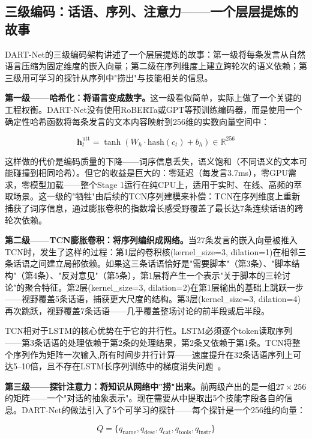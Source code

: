 \documentclass[twocolumn,10.5pt]{ctexart}
\begin{document}
\subsection{三级编码：话语、序列、注意力——一个层层提炼的故事}

DART-Net的三级编码架构讲述了一个层层提炼的故事：第一级将每条发言从自然语言压缩为固定维度的嵌入向量；第二级在序列维度上建立跨轮次的语义依赖；第三级用可学习的探针从序列中"捞出"与技能相关的信息。

\textbf{第一级——哈希化：将语言变成数字。}这一级看似简单，实际上做了一个关键的工程权衡。DART-Net没有使用RoBERTa或GPT等预训练编码器，而是使用一个确定性哈希函数将每条发言的文本内容映射到256维的实数向量空间中：

\begin{equation}
\mathbf{h}_t^{\text{utt}} = \tanh(W_h \cdot \text{hash}(c_t) + b_h) \in \mathbb{R}^{256}
\label{eq:hash_enc}
\end{equation}

这样做的代价是编码质量的下降——词序信息丢失，语义饱和（不同语义的文本可能碰撞到相同哈希）。但它的收益是巨大的：零延迟（每发言3.7ms），零GPU需求，零模型加载——整个Stage 1运行在纯CPU上，适用于实时、在线、高频的萃取场景。这一级的"牺牲"由后续的TCN序列建模来补偿：TCN在序列维度上重新捕获了词序信息，通过膨胀卷积的指数增长感受野覆盖了最长达7条连续话语的跨轮次依赖。

\textbf{第二级——TCN膨胀卷积：将序列编织成网络。}当27条发言的嵌入向量被推入TCN时，发生了这样的过程：第1层的卷积核(kernel\_size=3, dilation=1)在相邻三条话语之间建立局部依赖。如果这三条话语恰好是"需要脚本"（第3条）、"脚本结构"（第4条）、"反对意见"（第5条），第1层将产生一个表示"关于脚本的三轮讨论"的聚合特征。第2层(kernel\_size=3, dilation=2)在第1层输出的基础上跳跃一步——视野覆盖5条话语，捕获更大尺度的结构。第3层(kernel\_size=3, dilation=4)再次跳跃，视野覆盖7条话语——几乎覆盖整场讨论的前半段或后半段。

TCN相对于LSTM的核心优势在于它的并行性。LSTM必须逐个token读取序列——第3条话语的处理依赖于第2条的处理结果，第2条又依赖于第1条。TCN将整个序列作为矩阵一次输入,所有时间步并行计算——速度提升在32条话语序列上可达5--10倍，且不存在LSTM长序列训练中的梯度消失问题~\cite{bai2018tcn}。

\textbf{第三级——探针注意力：将知识从网络中"捞"出来。}前两级产出的是一组$27 \times 256$的矩阵——一个"对话的抽象表示"。现在需要从中提取出5个技能字段各自的信息。DART-Net的做法引入了5个可学习的探针——每个探针是一个256维的向量：

\begin{equation}
Q = \{q_{\text{name}}, q_{\text{desc}}, q_{\text{cat}}, q_{\text{tools}}, q_{\text{instr}}\}
\label{eq:probes}
\end{equation}
\end{document}
